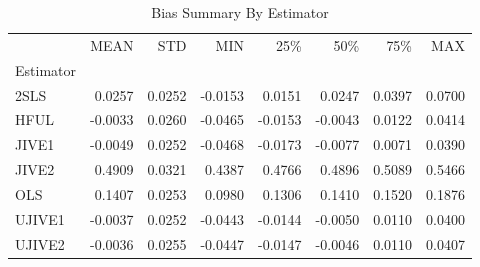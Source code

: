 \begin{table}[ht]
\centering
\caption{Bias Summary By Estimator}
\begin{tabular}{lrrrrrrr}
\toprule
 & MEAN & STD & MIN & 25\% & 50\% & 75\% & MAX \\
Estimator &  &  &  &  &  &  &  \\
\midrule
2SLS & 0.0257 & 0.0252 & -0.0153 & 0.0151 & 0.0247 & 0.0397 & 0.0700 \\
HFUL & -0.0033 & 0.0260 & -0.0465 & -0.0153 & -0.0043 & 0.0122 & 0.0414 \\
JIVE1 & -0.0049 & 0.0252 & -0.0468 & -0.0173 & -0.0077 & 0.0071 & 0.0390 \\
JIVE2 & 0.4909 & 0.0321 & 0.4387 & 0.4766 & 0.4896 & 0.5089 & 0.5466 \\
OLS & 0.1407 & 0.0253 & 0.0980 & 0.1306 & 0.1410 & 0.1520 & 0.1876 \\
UJIVE1 & -0.0037 & 0.0252 & -0.0443 & -0.0144 & -0.0050 & 0.0110 & 0.0400 \\
UJIVE2 & -0.0036 & 0.0255 & -0.0447 & -0.0147 & -0.0046 & 0.0110 & 0.0407 \\
\bottomrule
\end{tabular}
\end{table}
